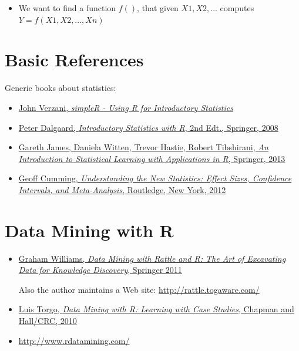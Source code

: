 \documentclass[]{book}
\providecommand{\tightlist}{%
  \setlength{\itemsep}{0pt}\setlength{\parskip}{0pt}}
\begin{document}
\begin{itemize}
\tightlist
\item
  We want to find a function \(f()\), that given \(X1, X2, ...\)
  computes \(Y=f(X1, X2, ..., Xn)\)
\end{itemize}

\section{Basic References}\label{basic-references}

Generic books about statistics:

\begin{itemize}
\item
  \href{https://cran.r-project.org/doc/contrib/Verzani-SimpleR.pdf}{John
  Verzani, \emph{simpleR - Using R for Introductory Statistics}}
\item
  \href{https://www.springer.com/gp/book/9780387790534}{Peter Dalgaard,
  \emph{Introductory Statistics with R}, 2nd Edt., Springer, 2008}
\item
  \href{http://www.springer.com/it/book/9781461471370}{Gareth James,
  Daniela Witten, Trevor Hastie, Robert Tibshirani, \emph{An
  Introduction to Statistical Learning with Applications in R},
  Springer, 2013}
\item
  \href{https://www.routledge.com/products/9780415879682}{Geoff Cumming,
  \emph{Understanding the New Statistics: Effect Sizes, Confidence
  Intervals, and Meta-Analysis}, Routledge, New York, 2012}
\end{itemize}

\section{Data Mining with R}\label{data-mining-with-r}

\begin{itemize}
\item
  \href{http://www.springer.com/gp/book/9781441998897}{Graham Williams,
  \emph{Data Mining with Rattle and R: The Art of Excavating Data for
  Knowledge Discovery}, Springer 2011}

  Also the author maintains a Web site:
  \url{http://rattle.togaware.com/}
\item
  \href{https://www.crcpress.com/Data-Mining-with-R-Learning-with-Case-Studies/Torgo/9781439810187}{Luis
  Torgo, \emph{Data Mining with R: Learning with Case Studies}, Chapman
  and Hall/CRC, 2010}
\item
  \url{http://www.rdatamining.com/}
\end{itemize}
\end{document}
